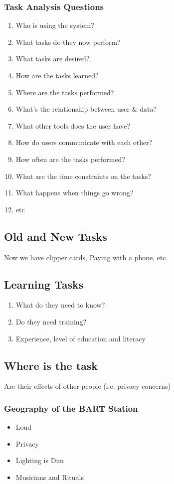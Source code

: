 \subsubsection{Task Analysis Questions}
\begin{enumerate}
    \item Who is using the system?
    \item What tasks do they now perform?
    \item What tasks are desired?
    \item How are the tasks learned?
    \item Where are the tasks performed?
    \item What's the relationship between user \& data? 
    \item What other tools does the user have?
    \item How do users communicate with each other? 
    \item How often are the tasks performed? 
    \item What are the time constraints on the tasks? 
    \item What happens when things go wrong?
    \item etc
\end{enumerate}

\subsection{Old and New Tasks}
Now we have clipper cards, Paying with a phone, etc.

\subsection{Learning Tasks}
\begin{enumerate}
    \item What do they need to know?
    \item Do they need training?
    \item Experience, level of education and literacy
\end{enumerate}

\subsection{Where is the task}
Are their effects of other people (i.e. privacy concerns)
\subsubsection{Geography of the BART Station}
\begin{itemize}
    \item Loud
    \item Privacy
    \item Lighting is Dim
    \item Musicians and Rituals
\end{itemize}

